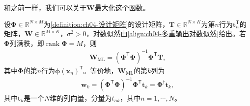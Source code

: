 \documentclass[../../main.tex]{subfiles}
\begin{document}
和之前一样，我们可以关于$\boldsymbol{W}$最大化这个函数。

\begin{proposition}[多重输出的最大似然解]\label{proposition:ch04-多重输出解}
设$\boldsymbol{\Phi}\in\mathbb{R}^{N\times M}$为\cref{definition:ch04-设计矩阵}的设计矩阵，$\boldsymbol{T}\in\mathbb{R}^{N\times K}$为第$n$行为$\boldsymbol{t}_n^{\mathsf{T}}$的矩阵，$\boldsymbol{W}\in\mathbb{R}^{M\times K}$，$\sigma^{2}>0$，对数似然由\eqref{align:ch04-多重输出对数似然}给出。若$\boldsymbol{\Phi}$列满秩，即$\operatorname{rank}\boldsymbol{\Phi}=M$，则
\begin{align}
  \boldsymbol{W}_{\mathrm{ML}}=(\boldsymbol{\Phi}^{\mathsf{T}}\boldsymbol{\Phi})^{-1}\boldsymbol{\Phi}^{\mathsf{T}}\boldsymbol{T},
  \label{align:ch04-多重输出ML}
\end{align}
其中$\boldsymbol{\Phi}$的第$n$行为$\boldsymbol{\phi}(\boldsymbol{x}_n)^{\mathsf{T}}$。等价地，$\boldsymbol{W}_{\mathrm{ML}}$的第$k$列为
\begin{align}
  \boldsymbol{w}_k=(\boldsymbol{\Phi}^{\mathsf{T}}\boldsymbol{\Phi})^{-1}\boldsymbol{\Phi}^{\mathsf{T}}\boldsymbol{t}_k=\boldsymbol{\Phi}^{\dagger}\boldsymbol{t}_k,
  \label{align:ch04-多重输出分量}
\end{align}
其中$\boldsymbol{t}_k$是一个$N$维的列向量，分量为$t_{nk}$，其中$n=1,\cdots,N$。
\end{proposition}
\end{document}
